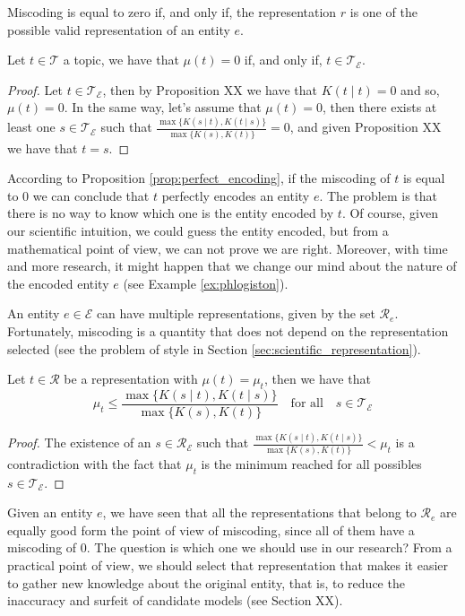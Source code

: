 Miscoding is equal to zero if, and only if, the representation $r$ is one of the possible valid representation of an entity $e$.

\begin{proposition}\label{prop:perfect_encoding}
Let $t \in \mathcal{T}$ a topic, we have that $\mu(t) = 0$ if, and only if, $t \in \mathcal{T}_\mathcal{E}$.
\end{proposition}
\begin{proof}
Let $t \in \mathcal{T}_\mathcal{E}$, then by Proposition {\color{red} XX} we have that $K(t \mid t) = 0$ and so, $\mu(t) = 0$. In the same way, let's assume that $\mu(t) = 0$, then there exists at least one $s \in \mathcal{T}_\mathcal{E}$ such that $\frac{ \max\{ K(s \mid t), K(t \mid s) \} } { \max\{ K(s), K(t) \} } = 0$, and given Proposition {\color{red} XX} we have that $t = s$.
\end{proof}

According to Proposition \ref{prop:perfect_encoding}, if the miscoding of $t$ is equal to 0 we can conclude that $t$ perfectly encodes an entity $e$. The problem is that there is no way to know which one is the entity encoded by $t$. Of course, given our scientific intuition, we could guess the entity encoded, but from a mathematical point of view, we can not prove we are right. Moreover, with time and more research, it might happen that we change our mind about the nature of the encoded entity $e$ (see Example \ref{ex:phlogiston}).

An entity $e \in \mathcal{E}$ can have multiple representations, given by the set $\mathcal{R}_e$. Fortunately, miscoding is a quantity that does not depend on the representation selected (see the problem of style in Section \ref{sec:scientific_representation}).

\begin{proposition}
Let $t \in \mathcal{R}$ be a representation with $\mu(t) = \mu_t$, then we have that
\[
\mu_t \leq \frac{ \max\{ K(s \mid t), K(t \mid s) \} } { \max\{ K(s), K(t) \} } \quad \textrm{for all} \quad s \in \mathcal{T}_\mathcal{E}
\]
\end{proposition}
\begin{proof}
The existence of an $s \in \mathcal{R}_\mathcal{E}$ such that $\frac{ \max\{ K(s \mid t), K(t \mid s) \} } { \max\{ K(s), K(t) \} } < \mu_t$ is a contradiction with the fact that $\mu_t$ is the minimum reached for all possibles $s \in \mathcal{T}_\mathcal{E}$.
\end{proof}

Given an entity $e$, we have seen that all the representations that belong to $\mathcal{R}_e$ are equally good form the point of view of miscoding, since all of them have a miscoding of $0$. The question is which one we should use in our research? From a practical point of view, we should select that representation that makes it easier to gather new knowledge about the original entity, that is, to reduce the inaccuracy and surfeit of candidate models (see Section {\color{red} XX}).

